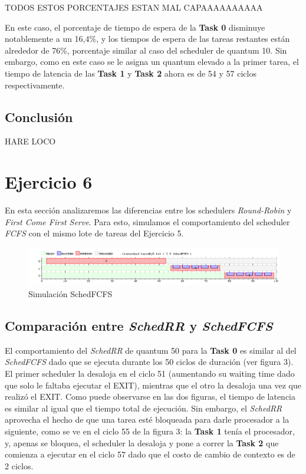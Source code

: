 \documentclass[11pt]{article}
\begin{document}
\begin{enumerate}
\begin{enumerate}
  TODOS ESTOS PORCENTAJES ESTAN MAL CAPAAAAAAAAAA

  En este caso, el porcentaje de tiempo de espera de la \textbf{Task 0} disminuye notablemente a un 16,4\%, y los tiempos de espera de las tareas restantes están alrededor de 76\%, porcentaje similar al caso del scheduler de quantum 10. Sin embargo, como en este caso se le asigna un quantum elevado a la primer tarea, el tiempo de latencia de las \textbf{Task 1} y \textbf{Task 2} ahora es de 54 y 57 ciclos respectivamente. 
  \end{enumerate}

  \subsection{Conclusión}
  HARE LOCO

  \newpage

  \section{Ejercicio 6}

  En esta sección analizaremos las diferencias entre los schedulers \textit{Round-Robin} y \textit{First Come First Serve}. Para esto, simulamos el comportamiento del scheduler \textit{FCFS} con el mismo lote de tareas del Ejercicio 5.

        \begin{figure}[H]
          \includegraphics[scale=0.5]{Ej6}
          \caption{Simulación SchedFCFS}
        \end{figure}

  \subsection{Comparación entre \textit{SchedRR} y \textit{SchedFCFS}}

  El comportamiento del \textit{SchedRR} de quantum 50 para la \textbf{Task 0} es similar al del \textit{SchedFCFS} dado que se ejecuta durante los 50 ciclos de duración (ver figura 3). El primer scheduler la desaloja en el ciclo 51 (aumentando su waiting time dado que solo le faltaba ejecutar el EXIT), mientras que el otro la desaloja una vez que realizó el EXIT. Como puede observarse en las dos figuras, el tiempo de latencia es similar al igual que el tiempo total de ejecución. Sin embargo, el \textit{SchedRR} aprovecha el hecho de que una tarea esté bloqueada para darle procesador a la siguiente, como se ve en el ciclo 55 de la figura 3: la \textbf{Task 1} tenía el procesador, y, apenas se bloquea, el scheduler la desaloja y pone a correr la \textbf{Task 2} que comienza a ejecutar en el ciclo 57 dado que el costo de cambio de contexto es de 2 ciclos. \\


\end{enumerate}
\end{document}
